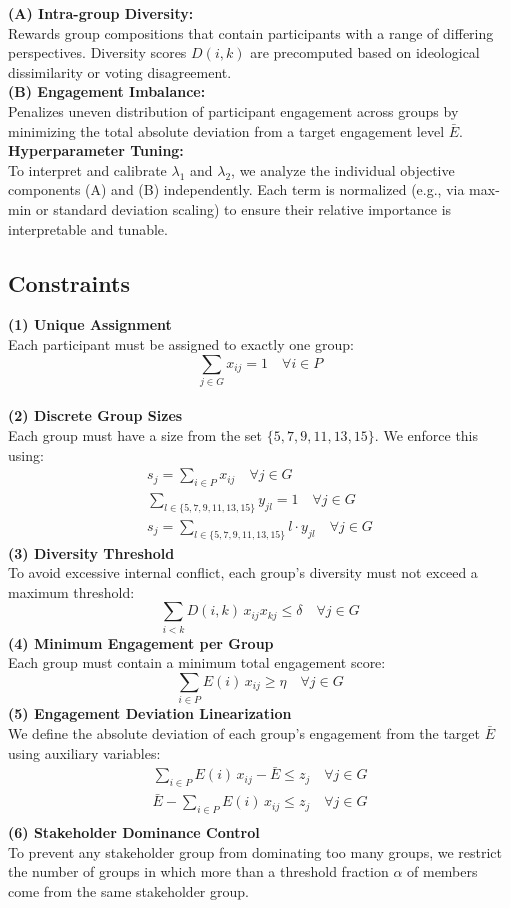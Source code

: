 \noindent
\textbf{(A) Intra-group Diversity:}\\[3pt]
Rewards group compositions that contain participants with a range of differing perspectives.
Diversity scores \(D(i,k)\) are precomputed based on ideological dissimilarity or voting disagreement.
\\
\textbf{(B) Engagement Imbalance:}\\[3pt]
Penalizes uneven distribution of participant engagement across groups by minimizing the total absolute deviation
from a target engagement level \(\bar{E}\).
\\
\textbf{Hyperparameter Tuning:}\\[3pt]
To interpret and calibrate \(\lambda_1\) and \(\lambda_2\), we analyze the individual objective components (A)
and (B) independently.
Each term is normalized (e.g., via max-min or standard deviation scaling)
to ensure their relative importance is interpretable and tunable.

\subsection*{Constraints}
\textbf{(1) Unique Assignment}\\[3pt]
Each participant must be assigned to exactly one group:
\[
\sum_{j \in G} x_{ij} = 1 \quad \forall i \in P
\]
\\
\textbf{(2) Discrete Group Sizes}\\[3pt]
Each group must have a size from the set \(\{5,7,9,11,13,15\}\).
We enforce this using:
\begin{gather*}
    s_j = \sum_{i \in P} x_{ij} \quad \forall j \in G\\
    \sum_{l \in \{5,7,9,11,13,15\}} y_{jl} = 1 \quad \forall j \in G\\
    s_j = \sum_{l \in \{5,7,9,11,13,15\}} l \cdot y_{jl} \quad \forall j \in G
\end{gather*}
\textbf{(3) Diversity Threshold}\\[3pt]
To avoid excessive internal conflict, each group’s diversity must not exceed a maximum threshold:
\[
\sum_{i < k} D(i,k)\,x_{ij} x_{kj} \leq \delta \quad \forall j \in G
\]
\textbf{(4) Minimum Engagement per Group}\\[3pt]
Each group must contain a minimum total engagement score:
\[
\sum_{i \in P} E(i)\,x_{ij} \geq \eta \quad \forall j \in G
\]
\textbf{(5) Engagement Deviation Linearization}\\[3pt]
We define the absolute deviation of each group’s engagement from the target \(\bar{E}\) using auxiliary variables:
\begin{gather*}
    \sum_{i \in P} E(i)\,x_{ij} - \bar{E} \leq z_j \quad \forall j \in G\\
    \bar{E} - \sum_{i \in P} E(i)\,x_{ij} \leq z_j \quad \forall j \in G\\
\end{gather*}
\textbf{(6) Stakeholder Dominance Control}\\[3pt]
To prevent any stakeholder group from dominating too many groups, we restrict the number of groups
in which more than a threshold fraction \(\alpha\) of members come from the same stakeholder group.

